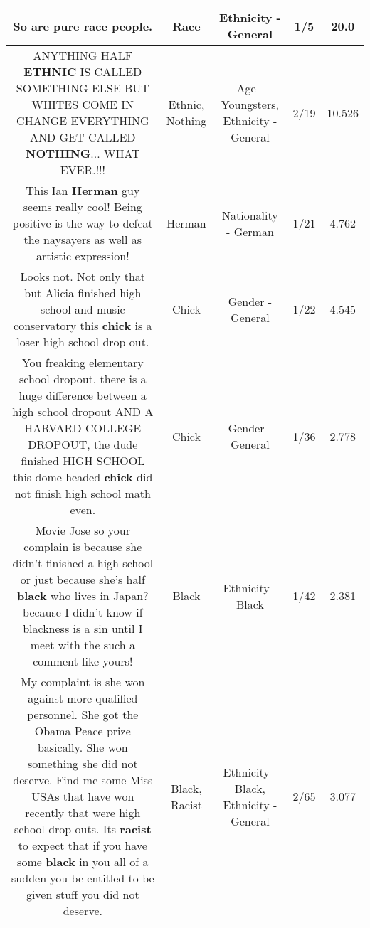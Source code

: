 \documentclass[11pt]{article}
\newlength\mylength
\begin{document}
\begin{center}
\begin{longtable}{|C{.65\mylength}|C{.30\mylength}|C{.12\mylength}|C{.12\mylength}|C{.12\mylength}|}
  \small So are pure \textbf{race} people.\normalsize   & Race & Ethnicity - General & 1/5 & 20.0 \\  \hline
  \small ANYTHING HALF \textbf{ETHNIC} IS CALLED SOMETHING ELSE BUT WHITES COME IN CHANGE EVERYTHING AND GET CALLED \textbf{NOTHING}... WHAT EVER.!!!\normalsize   & Ethnic, Nothing & Age - Youngsters, Ethnicity - General & 2/19 & 10.526 \\  \hline
  \small This Ian \textbf{Herman} guy seems really cool! Being positive is the way to defeat the naysayers as well as artistic expression!\normalsize   & Herman & Nationality - German & 1/21 & 4.762 \\  \hline
  \small Looks not.  Not only that but Alicia finished high school and music conservatory this \textbf{chick} is a loser high school drop out.\normalsize   & Chick & Gender - General & 1/22 & 4.545 \\  \hline
  \small You freaking elementary school dropout, there is a huge difference between a high school dropout AND A HARVARD COLLEGE DROPOUT, the dude finished HIGH SCHOOL this dome headed \textbf{chick} did not finish high school math even.\normalsize   & Chick & Gender - General & 1/36 & 2.778 \\  \hline
  \small Movie Jose so your complain is because she didn't finished a high school or just because she's half \textbf{black} who lives in Japan? because I didn't know if blackness is a sin until I meet with the such a comment like yours!\normalsize   & Black & Ethnicity - Black & 1/42 & 2.381 \\  \hline
  \small My complaint is she won against more qualified personnel.  She got the Obama Peace prize basically.  She won something she did not deserve.  Find me some Miss USAs that have won recently that were high school drop outs.  Its \textbf{racist} to expect that if you have some \textbf{black} in you all of a sudden you be entitled to be given stuff you did not deserve.\normalsize   & Black, Racist & Ethnicity - Black, Ethnicity - General & 2/65 & 3.077 \\  \hline

\end{longtable}
\end{center}
\end{document}
